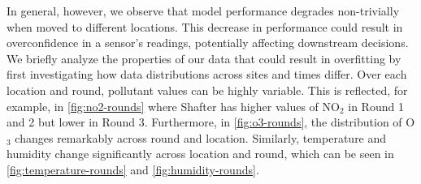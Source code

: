 \documentclass[journal abbreviation, manuscript]{copernicus}
\newcommand\todo[1]{\textcolor{red}{#1}}
\newcommand{\textus}[1]{$_{\text{#1}}$}
\begin{document}
In general, however, we observe that model performance degrades non-trivially
when moved to different locations. This decrease in performance could result in overconfidence in a sensor's readings, potentially affecting downstream decisions. We briefly analyze the properties of our data that could result in overfitting by first investigating how data distributions across sites and times differ. Over each location and round, pollutant values can be highly variable. This is reflected, for example, in \autoref{fig:no2-rounds} where Shafter has higher values of NO\textus{2} in Round 1 and 2 but lower in Round 3. Furthermore, in \autoref{fig:o3-rounds}, the distribution of O\textus{3} changes remarkably across round and location. Similarly, temperature and humidity change significantly across location and round, which can be seen in \autoref{fig:temperature-rounds} and \autoref{fig:humidity-rounds}.

\end{document}
